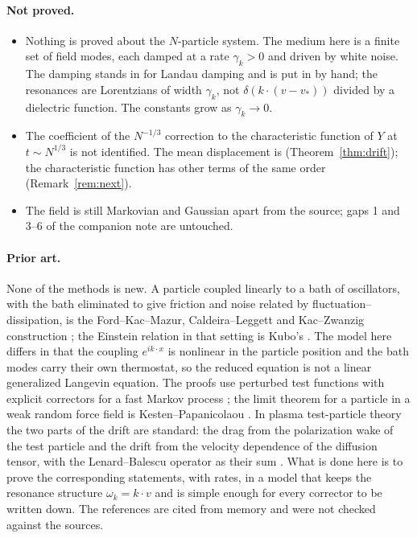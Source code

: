 \documentclass[11pt]{article}
\theoremstyle{remark}
\begin{document}
\paragraph{Not proved.}
\begin{itemize}
  \item Nothing is proved about the $N$-particle system. The medium here is
    a finite set of field modes, each damped at a rate $\gamma_k>0$ and
    driven by white noise. The damping stands in for Landau damping and is
    put in by hand; the resonances are Lorentzians of width $\gamma_k$, not
    $\delta(k\cdot(v-v_*))$ divided by a dielectric function. The constants
    grow as $\gamma_k\to0$.
  \item The coefficient of the $N^{-1/3}$ correction to the characteristic
    function of $Y$ at $t\sim N^{1/3}$ is not identified. The mean
    displacement is (Theorem~\ref{thm:drift}); the characteristic function
    has other terms of the same order (Remark~\ref{rem:next}).
  \item The field is still Markovian and Gaussian apart from the source;
    gaps 1 and 3--6 of the companion note are untouched.
\end{itemize}

\paragraph{Prior art.}
None of the methods is new. A particle coupled linearly to a bath of
oscillators, with the bath eliminated to give friction and noise related by
fluctuation--dissipation, is the Ford--Kac--Mazur, Caldeira--Leggett and
Kac--Zwanzig construction \cite{FKM,CL,Zwanzig}; the Einstein relation in that
setting is Kubo's \cite{Kubo}. The model here differs in that the coupling
$e^{ik\cdot x}$ is nonlinear in the particle position and the bath modes
carry their own thermostat, so the reduced equation is not a linear
generalized Langevin equation. The proofs use perturbed test functions with
explicit correctors for a fast Markov process
\cite{PSV,PavliotisStuart}; the limit theorem for a particle in a weak
random force field is Kesten--Papanicolaou \cite{KP}. In plasma test-particle
theory the two parts of the drift are standard: the drag from the
polarization wake of the test particle and the drift from the velocity
dependence of the diffusion tensor, with the Lenard--Balescu operator as
their sum \cite{RR,TH,Hubbard,Lenard,Balescu}. What is done here is to prove
the corresponding statements, with rates, in a model that keeps the
resonance structure $\omega_k=k\cdot v$ and is simple enough for every
corrector to be written down. The references are cited from memory and were
not checked against the sources.
\end{document}
